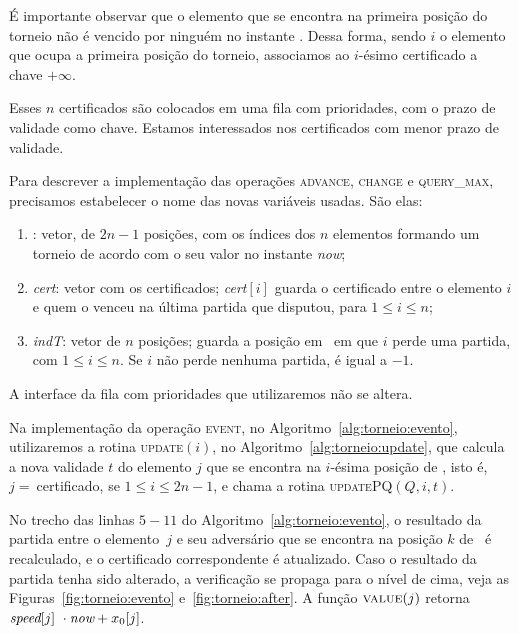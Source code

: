 

É importante observar que o elemento que se encontra na primeira posição do torneio não é vencido
por ninguém no instante \now.
Dessa forma, sendo $i$ o elemento que ocupa a primeira posição do torneio, associamos ao $i$-ésimo
certificado a chave $+\infty$.

Esses $n$ certificados são colocados em uma fila com prioridades, com o prazo de validade como
chave.
Estamos interessados nos certificados com menor prazo de validade.

Para descrever a implementação das operações \textsc{advance}, \textsc{change} e \textsc{query\_max}, precisamos estabelecer o nome das novas variáveis usadas.
São elas:
\begin{enumerate}
    \item \torneio: vetor, de $2n - 1$ posições, com os índices dos
    $n$ elementos formando um torneio de acordo com o seu valor no
    instante \textit{now};

    \item \textit{cert}: vetor com os certificados;
    \textit{cert}$[i]$ guarda o certificado entre o elemento $i$ e
    quem o venceu na última partida que disputou, para $1 \leq i \leq n$;

    \item \textit{indT}: vetor de $n$ posições; \indt[$i$] guarda a
    posição em \torneio~em que $i$ perde uma partida, com $1 \leq i
    \leq n$.
    Se $i$ não perde nenhuma partida, \indt[$i$] é igual a $-1$.
\end{enumerate}

A interface da fila com prioridades que utilizaremos não se altera.

Na implementação da operação \textsc{event}, no Algoritmo~\ref{alg:torneio:evento}, utilizaremos a
rotina \textsc{update}$(i)$, no Algoritmo~\ref{alg:torneio:update}, que calcula a nova validade $t$ do
elemento $j$ que se encontra na $i$-ésima posição de \torneio, isto é, $j =~$\torneio[$i$]
certificado, se $1 \leq i \leq 2n - 1$, e chama a rotina \textsc{updatePQ}$(Q, i, t)$.





No trecho das linhas $5 - 11$ do Algoritmo~\ref{alg:torneio:evento}, o resultado da partida entre o
elemento~$j$ e seu adversário que se encontra na posição $k$ de \torneio~é recalculado, e o
certificado correspondente é atualizado.
Caso o resultado da partida tenha sido alterado, a verificação se propaga para o nível de cima,
veja as Figuras~\ref{fig:torneio:evento} e~\ref{fig:torneio:after}.
A função $\Call{value}{j}$ retorna ${\textit{speed}[j]~\cdot\textit{now} + x_0[j]}$.

